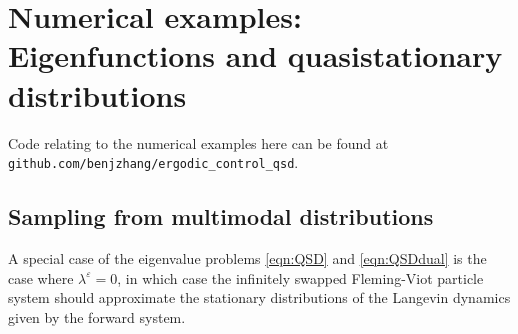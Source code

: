 \documentclass[english,11pt]{article}%
\numberwithin{equation}{section}
\numberwithin{example}{section}
\numberwithin{theorem}{section}
\begin{document}




\section{Numerical examples: Eigenfunctions and quasistationary distributions}

Code relating to the numerical examples here can be found at \\ \texttt{github.com/benjzhang/ergodic\_control\_qsd}. 

\subsection{Sampling from multimodal distributions}
A special case of the eigenvalue problems \eqref{eqn:QSD} and \eqref{eqn:QSDdual} is the case where $\lambda^\varepsilon = 0$, in which case the infinitely swapped Fleming-Viot particle system should approximate the stationary distributions of the Langevin dynamics given by the forward system. 
\end{document}
